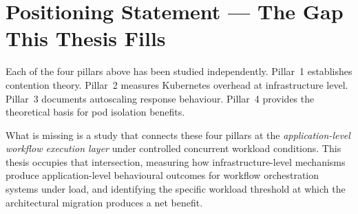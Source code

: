 \section{Positioning Statement --- The Gap This Thesis Fills}

Each of the four pillars above has been studied independently. Pillar~1 establishes
contention theory. Pillar~2 measures Kubernetes overhead at infrastructure level. Pillar~3
documents autoscaling response behaviour. Pillar~4 provides the theoretical basis for pod
isolation benefits.

What is missing is a study that connects these four pillars at the \textit{application-level
workflow execution layer} under controlled concurrent workload conditions. This thesis
occupies that intersection, measuring how infrastructure-level mechanisms produce
application-level behavioural outcomes for workflow orchestration systems under load, and
identifying the specific workload threshold at which the architectural migration produces a
net benefit.

